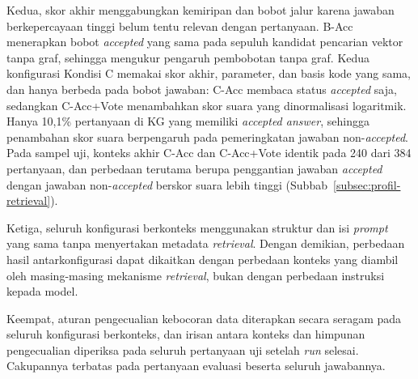 Kedua, skor akhir menggabungkan kemiripan dan bobot jalur karena jawaban berkepercayaan tinggi belum tentu relevan dengan pertanyaan. B-Acc menerapkan bobot \emph{accepted} yang sama pada sepuluh kandidat pencarian vektor tanpa graf, sehingga mengukur pengaruh pembobotan tanpa graf. Kedua konfigurasi Kondisi C memakai skor akhir, parameter, dan basis kode yang sama, dan hanya berbeda pada bobot jawaban: C-Acc membaca status \emph{accepted} saja, sedangkan C-Acc+Vote menambahkan skor suara yang dinormalisasi logaritmik. Hanya 10,1\% pertanyaan di KG yang memiliki \emph{accepted answer}, sehingga penambahan skor suara berpengaruh pada pemeringkatan jawaban non-\emph{accepted}. Pada sampel uji, konteks akhir C-Acc dan C-Acc+Vote identik pada 240 dari 384 pertanyaan, dan perbedaan terutama berupa penggantian jawaban \emph{accepted} dengan jawaban non-\emph{accepted} berskor suara lebih tinggi (Subbab~\ref{subsec:profil-retrieval}).

Ketiga, seluruh konfigurasi berkonteks menggunakan struktur dan isi \emph{prompt} yang sama tanpa menyertakan metadata \emph{retrieval}. Dengan demikian, perbedaan hasil antarkonfigurasi dapat dikaitkan dengan perbedaan konteks yang diambil oleh masing-masing mekanisme \emph{retrieval}, bukan dengan perbedaan instruksi kepada model.

Keempat, aturan pengecualian kebocoran data diterapkan secara seragam pada seluruh konfigurasi berkonteks, dan irisan antara konteks dan himpunan pengecualian diperiksa pada seluruh pertanyaan uji setelah \emph{run} selesai. Cakupannya terbatas pada pertanyaan evaluasi beserta seluruh jawabannya.